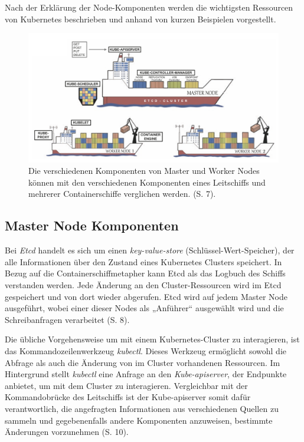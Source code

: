 \documentclass[11pt,a4paper]{article}
\begin{document}
Nach der Erklärung der Node-Komponenten werden die wichtigsten Ressourcen
von Kubernetes beschrieben und anhand von kurzen Beispielen vorgestellt.

\begin{figure}[h]
  \centering
  \includegraphics[width=1\textwidth]{./media/Schmeling_Dargatz_2022 S.7.png}
  \caption{Die verschiedenen Komponenten von Master und Worker Nodes können mit den
    verschiedenen Komponenten eines Leitschiffs und mehrerer Containerschiffe verglichen werden. \cite{Schmeling_Dargatz_2022} (S. 7).}
  \label{fig:containerschiff}
\end{figure}

\subsection{Master Node Komponenten}
\label{sec:MasterNodeKomponenten}
Bei \emph{Etcd} handelt es sich um einen \emph{key-value-store} (Schlüssel-Wert-Speicher),
der alle Informationen über den Zustand eines Kubernetes Clusters speichert.
In Bezug auf die Containerschiffmetapher kann Etcd als das Logbuch des Schiffs verstanden werden.
Jede Änderung an den Cluster-Ressourcen wird im Etcd gespeichert und von dort wieder abgerufen.
Etcd wird auf jedem Master Node ausgeführt, wobei einer dieser Nodes als „Anführer“
ausgewählt wird und die Schreibanfragen verarbeitet \cite{Schmeling_Dargatz_2022} (S. 8).

Die übliche Vorgehensweise um mit einem Kubernetes-Cluster zu interagieren, ist das Kommandozeilenwerkzeug \emph{kubectl}.
Dieses Werkzeug ermöglicht sowohl die Abfrage als auch die Änderung von im Cluster vorhandenen Ressourcen.
Im Hintergrund stellt \emph{kubectl} eine Anfrage an den \emph{Kube-apiserver}, der Endpunkte anbietet,
um mit dem Cluster zu interagieren. Vergleichbar mit der Kommandobrücke des Leitschiffs ist der Kube-apiserver
somit dafür verantwortlich, die angefragten Informationen
aus verschiedenen Quellen zu sammeln und gegebenenfalls andere Komponenten anzuweisen, bestimmte Änderungen vorzunehmen \cite{Schmeling_Dargatz_2022} (S. 10).
\end{document}
